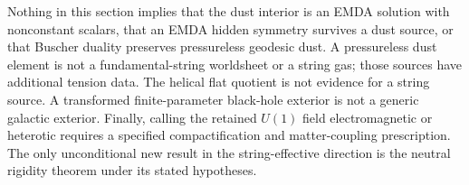 \begin{remark}
\label{rem:physical-string-nonimplications}
Nothing in this section implies that the dust interior is an EMDA solution
with nonconstant scalars, that an EMDA hidden symmetry survives a dust
source, or that Buscher duality preserves pressureless geodesic dust. A
pressureless dust element is not a fundamental-string worldsheet or a
string gas; those sources have additional tension data. The helical flat
quotient is not evidence for a string source. A transformed finite-parameter
black-hole exterior is not a generic galactic exterior. Finally, calling
the retained $U(1)$ field electromagnetic or heterotic requires a specified
compactification and matter-coupling prescription. The only unconditional
new result in the string-effective direction is the neutral rigidity
theorem under its stated hypotheses.
\end{remark}
